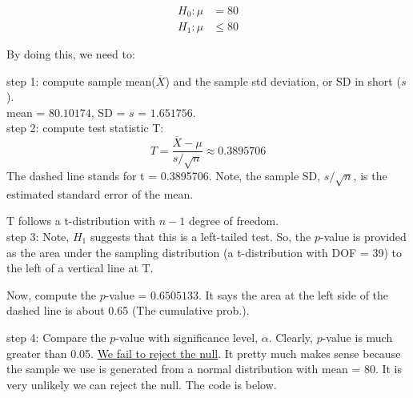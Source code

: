 \documentclass[12pt]{article}
\begin{document}
\begin{align*}
H_0: \mu &= 80\\
H_1: \mu &\le 80
\end{align*}



By doing this, we need to:

step 1: compute sample mean($  \overline{X} $) and the sample std 
deviation, or SD in short ($ s $).\\
mean = $ 80.10174 $, SD = $ s $ = $ 1.651756 $.
\\

step 2: compute test statistic T:
\begin{equation*}
T = \frac{ \overline{X} - \mu}{s/\sqrt {n}} \approx 0.3895706
\end{equation*}	
The dashed line stands for t = 0.3895706.
Note, the sample SD, $ s/\sqrt {n} $, is the estimated standard 
error of the mean.

T follows a t-distribution with $ n - 1 $ degree of freedom.\\

step 3: Note, $ H_1 $ suggests that this is a left-tailed test. So,
the $ p $-value is provided as the area under the sampling distribution
(a t-distribution with DOF = 39) to the left of a vertical line at T.

Now, compute the $ p $-value = $ 0.6505133 $. It says the area at the
left side of the dashed line is about 0.65 (The cumulative prob.).


step 4: Compare the $ p $-value with significance level, $ \alpha $.
Clearly, $ p $-value is much greater than 0.05. 
{\underline {We fail to reject the null}}. It pretty much makes sense
because the sample we use is generated from a normal distribution with
mean = 80. It is very unlikely we can reject the null. The code is 
below.
\end{document}
